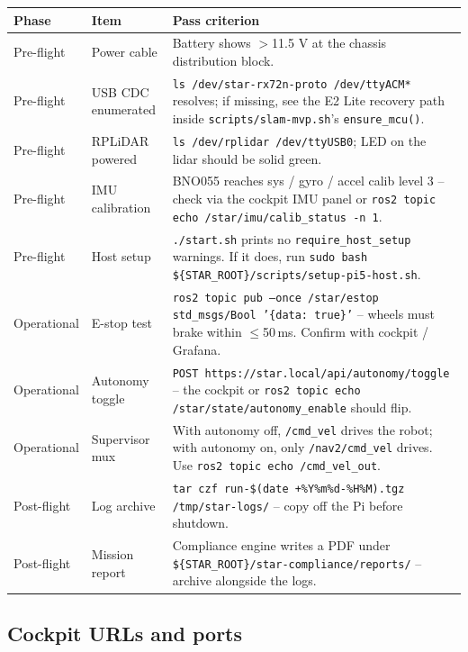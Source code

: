 \begin{center}
\begin{tabular}{|p{2.6cm}|p{4.0cm}|p{8.2cm}|}
\hline
\textbf{Phase} & \textbf{Item} & \textbf{Pass criterion} \\
\hline
Pre-flight & Power cable & Battery shows $>$11.5 V at the chassis
distribution block. \\
\hline
Pre-flight & USB CDC enumerated &
\texttt{ls /dev/star-rx72n-proto /dev/ttyACM*} resolves; if
missing, see the E2 Lite recovery path inside
\texttt{scripts/slam-mvp.sh}'s \texttt{ensure\_mcu()}. \\
\hline
Pre-flight & RPLiDAR powered &
\texttt{ls /dev/rplidar /dev/ttyUSB0}; LED on the lidar should be
solid green. \\
\hline
Pre-flight & IMU calibration & BNO055 reaches sys / gyro / accel
calib level 3 -- check via the cockpit IMU panel or
\texttt{ros2 topic echo /star/imu/calib\_status -n 1}. \\
\hline
Pre-flight & Host setup &
\texttt{./start.sh} prints no \texttt{require\_host\_setup}
warnings. If it does, run
\texttt{sudo bash \$\{STAR\_ROOT\}/scripts/setup-pi5-host.sh}. \\
\hline
Operational & E-stop test &
\texttt{ros2 topic pub --once /star/estop std\_msgs/Bool '\{data: true\}'}
-- wheels must brake within $\le$50\,ms. Confirm with cockpit /
Grafana. \\
\hline
Operational & Autonomy toggle &
\texttt{POST https://star.local/api/autonomy/toggle} -- the cockpit
or \texttt{ros2 topic echo /star/state/autonomy\_enable} should
flip. \\
\hline
Operational & Supervisor mux &
With autonomy off, \texttt{/cmd\_vel} drives the robot; with
autonomy on, only \texttt{/nav2/cmd\_vel} drives. Use
\texttt{ros2 topic echo /cmd\_vel\_out}. \\
\hline
Post-flight & Log archive &
\texttt{tar czf run-\$(date +\%Y\%m\%d-\%H\%M).tgz /tmp/star-logs/}
-- copy off the Pi before shutdown. \\
\hline
Post-flight & Mission report &
Compliance engine writes a PDF under
\texttt{\$\{STAR\_ROOT\}/star-compliance/reports/} -- archive
alongside the logs. \\
\hline
\end{tabular}
\end{center}

\subsection{Cockpit URLs and ports}

